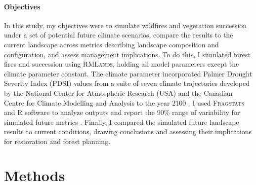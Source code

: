 \paragraph*{Objectives}
In this study, my objectives were to simulate wildfires and vegetation succession under a set of potential future climate scenarios, compare the results to the current landscape across metrics describing landscape composition and configuration, and assess management implications. To do this, I simulated forest fires and succession using \textsc{RMLands}, holding all model parameters except the climate parameter constant. The climate parameter incorporated Palmer Drought Severity Index (PDSI) values from a suite of seven climate trajectories developed by the National Center for Atmospheric Research (USA) and the Canadian Centre for Climate Modelling and Analysis to the year 2100 \citep{Cook2014}. I used \textsc{Fragstats} and R software to analyze outputs and report the 90\% range of variability for simulated future metrics \citep{Fragstats2012,RCoreTeam2013}. Finally, I compared the simulated future landscape results to current conditions, drawing conclusions and assessing their implications for restoration and forest planning.






\section{Methods}

